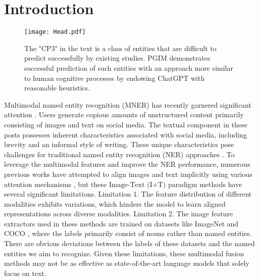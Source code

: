 \documentclass[11pt]{article}
\begin{document}
\section{Introduction}
\begin{figure}[h]
  \scriptsize
      \setlength{\belowcaptionskip}{-0.5cm}
    \centering  
    \texttt{[image: Head.pdf]}
  \caption{The "CP3" in the text is a class of entities that are difficult to predict successfully by existing studies. PGIM demonstrates successful prediction of such entities with an approach more similar to human cognitive processes by endowing ChatGPT with reasonable heuristics.}
  \label{headphoto}
\end{figure}
Multimodal named entity recognition (MNER) has recently  garnered significant attention \citep{lu2018visual}. Users generate copious amounts of unstructured content primarily consisting of images and text on social media. The textual component in these posts possesses inherent characteristics associated with social media, including brevity and an informal style of writing. 
These unique characteristics pose challenges for traditional named entity recognition (NER) approaches \citep{chiu2016named,devlin2018bert}. 
To leverage the multimodal features and improve the NER performance, numerous previous works have attempted to align images and text implicitly using various attention mechanisms \citep{yu2020improving,sun2021rpbert}, but these $\text{Image-Text (I+T)}$ paradigm methods have several significant limitations. 
Limitation 1. The feature distribution of different modalities exhibits variations, which hinders the model to learn aligned representations across diverse modalities. Limitation 2. The image feature extractors used in these methods are trained on datasets like ImageNet \citep{deng2009imagenet} and COCO \citep{lin2014microsoft}, where the labels primarily consist of nouns rather than named entities. There are obvious deviations between the labels of these datasets and the named entities we aim to recognize. 
Given these limitations, these multimodal fusion methods may not be as effective as state-of-the-art language models that solely focus on text. 
\end{document}
